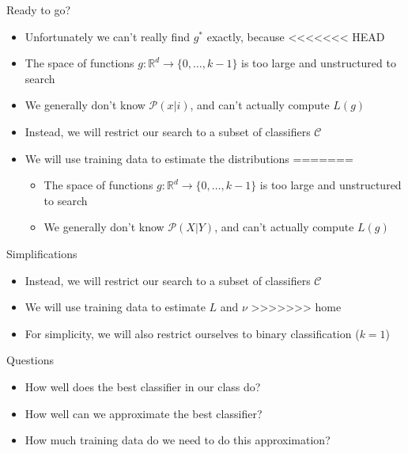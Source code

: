 \documentclass{beamer}
\renewcommand{\Pr}[1]{\mathcal{P} \left( #1 \right)}
\newcommand{\cls}{\mathcal{C}}
\newcommand{\R}{\mathbb{R}}
\begin{document}
\begin{frame}{Ready to go?}
\begin{itemize}
\item Unfortunately we can't really find $g^*$ exactly, because
<<<<<<< HEAD
\item The space of functions $g: \R^d \to \{0,\ldots,k-1\}$ is too large and unstructured to search
\item We generally don't know $\Pr{x|i}$, and can't actually compute $L(g)$
\\
\item Instead, we will restrict our search to a subset of classifiers $\cls$
\item We will use training data to estimate the distributions
=======
\begin{itemize}
\item The space of functions $g: \R^d \to \{0,\ldots,k-1\}$ is too large and unstructured to search
\item We generally don't know $\Pr{X|Y}$, and can't actually compute $L(g)$
\end{itemize}
\end{itemize}
\end{frame}

\begin{frame}{Simplifications}
\begin{itemize}
\item Instead, we will restrict our search to a subset of classifiers $\cls$
\item We will use training data to estimate $L$ and $\nu$
>>>>>>> home
\item For simplicity, we will also restrict ourselves to binary classification ($k=1$)
\end{itemize}
\end{frame}

\begin{frame}{Questions}
\begin{itemize}
\item How well does the best classifier in our class do?
\item How well can we approximate the best classifier?
\item How much training data do we need to do this approximation?
\end{itemize}
\end{frame}
\end{document}
